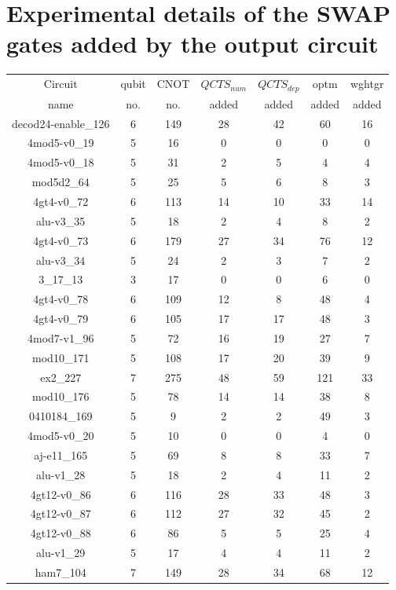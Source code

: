 \documentclass[runningheads]{llncs}
\begin{document}
\section{Experimental details of the SWAP gates added by the output circuit}
\begin{table}[H]
	\begin{center}  
	\begin{tabular}{|c|c|c|c|c|c|c|}
	\hline
	Circuit &  qubit  & CNOT &$QCTS_{num}$& $QCTS_{dep}$  & optm 	 & wghtgr 	\\
	 name	&   no. 	&	no. & added&  added &  added 	&  added\\
	\hline
	decod24-enable\_126 & 6 & 149 & 28 & 42 & 60 & 16 \\ 
4mod5-v0\_19 & 5 & 16 & 0 & 0 & 0 & 0 \\ 
4mod5-v0\_18 & 5 & 31 & 2 & 5 & 4 & 4 \\ 
mod5d2\_64 & 5 & 25 & 5 & 6 & 8 & 3 \\ 
4gt4-v0\_72 & 6 & 113 & 14 & 10 & 33 & 14 \\ 
alu-v3\_35 & 5 & 18 & 2 & 4 & 8 & 2 \\ 
4gt4-v0\_73 & 6 & 179 & 27 & 34 & 76 & 12 \\ 
alu-v3\_34 & 5 & 24 & 2 & 3 & 7 & 2 \\ 
3\_17\_13 & 3 & 17 & 0 & 0 & 6 & 0 \\ 
4gt4-v0\_78 & 6 & 109 & 12 & 8 & 48 & 4 \\ 
4gt4-v0\_79 & 6 & 105 & 17 & 17 & 48 & 3 \\ 
4mod7-v1\_96 & 5 & 72 & 16 & 19 & 27 & 7 \\ 
mod10\_171 & 5 & 108 & 17 & 20 & 39 & 9 \\ 
ex2\_227 & 7 & 275 & 48 & 59 & 121 & 33 \\ 
mod10\_176 & 5 & 78 & 14 & 14 & 38 & 8 \\ 
0410184\_169 & 5 & 9 & 2 & 2 & 49 & 3 \\ 
4mod5-v0\_20 & 5 & 10 & 0 & 0 & 4 & 0 \\ 
aj-e11\_165 & 5 & 69 & 8 & 8 & 33 & 7 \\ 
alu-v1\_28 & 5 & 18 & 2 & 4 & 11 & 2 \\ 
4gt12-v0\_86 & 6 & 116 & 28 & 33 & 48 & 3 \\ 
4gt12-v0\_87 & 6 & 112 & 27 & 32 & 45 & 2 \\ 
4gt12-v0\_88 & 6 & 86 & 5 & 5 & 25 & 4 \\ 
alu-v1\_29 & 5 & 17 & 4 & 4 & 11 & 2 \\ 
ham7\_104 & 7 & 149 & 28 & 34 & 68 & 12 \\ 

\end{tabular}
\end{center}
\end{table}
\end{document}
